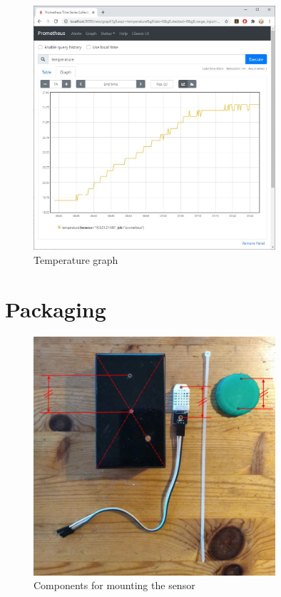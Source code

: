 \documentclass[a4paper, 12pt]{article}
\begin{document}
\begin{figure}[H]
  \centering
  \includegraphics[width=0.8\textwidth]{graph.jpg}
  \caption{Temperature graph}
\end{figure}
  

\section{Packaging}

\begin{figure}[H]
  \centering
  \includegraphics[width=0.8\textwidth]{sensor-mount.jpg}
  \caption{Components for mounting the sensor}
\end{figure}
\end{document}
